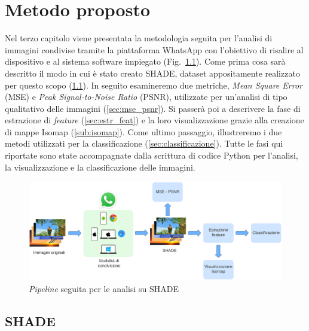 \chapter{Metodo proposto}
\label{cha:metodo_proposto}

Nel terzo capitolo viene presentata la metodologia seguita per l'analisi di immagini condivise tramite la piattaforma WhatsApp con l'obiettivo di risalire al dispositivo e al sistema software impiegato (Fig.~\ref{fig:metodo}). Come prima cosa sarà descritto il modo in cui è stato creato SHADE, dataset appositamente realizzato per questo scopo (\ref{sec:SHADE}). In seguito esamineremo due metriche, \textit{Mean Square Error} (MSE) e \textit{Peak Signal-to-Noise Ratio} (PSNR), utilizzate per un'analisi di tipo qualitativo delle immagini (\ref{sec:mse_psnr}). Si passerà poi a descrivere la fase di estrazione di \textit{feature} (\ref{sec:estr_feat}) e la loro visualizzazione grazie alla creazione di mappe Isomap (\ref{sub:isomap}). Come ultimo passaggio, illustreremo i due metodi utilizzati per la classificazione (\ref{sec:classificazione}). Tutte le fasi qui riportate sono state accompagnate dalla scrittura di codice Python per l'analisi, la visualizzazione e la classificazione delle immagini.

\begin{figure}[h!]
    \centering
    \includegraphics[width=\columnwidth]{Immagini/metodo_proposto.png}
    \caption{\textit{Pipeline} seguita per le analisi su SHADE}
    \label{fig:metodo}
\end{figure}

\section{SHADE}
\label{sec:SHADE}

